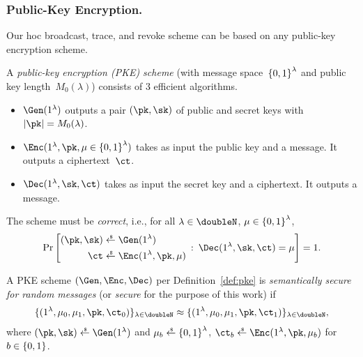 \subsubsection{Public-Key Encryption.}
Our \ad hoc broadcast, trace, and revoke scheme can be based on any public-key encryption scheme.

\begin{definition}[PKE]\label{def:pke}
A \emph{public-key encryption (PKE) scheme} (with message space~${\{0,1\}}^\lambda$ and public key length~$M_0(\lambda)$)
consists of 3 efficient algorithms.
\begin{itemize}
\item $\Gen(1^\lambda)$ outputs a pair $(\pk,\sk)$ of public and secret keys
with ${|\pk|=M_0(\lambda)}$.
\item ${\Enc(1^\lambda,\pk,\mu\in\bit^\lambda)}$ takes as input the public key and a message.
It outputs a ciphertext~$\ct$.
\item $\Dec(1^\lambda,\sk,\ct)$ takes as input the secret key and a ciphertext.
It outputs a message.
\end{itemize}
The scheme must be \emph{correct}, i.e., for all
${\lambda\in\doubleN}$,
${\mu\in{\{0,1\}}^\lambda}$,
\begin{align*}
\Pr\left[
\begin{aligned}
(\pk,\sk)&{}\draws\Gen(1^\lambda)\\
\ct&{}\draws\Enc(1^\lambda,\pk,\mu)
\end{aligned}
\::\:
\Dec(1^\lambda,\sk,\ct)=\mu
\right]=1.
\end{align*}
\end{definition}

\begin{definition}\label{def:pke-security}
A PKE scheme $(\Gen,\Enc,\Dec)$ per Definition~\ref{def:pke} is \emph{semantically secure for random messages} (or \emph{secure} for the purpose of this work) if
\begin{align*}
\{(1^\lambda,\mu_0,\mu_1,\pk,\ct_0)\}_{\lambda\in\doubleN}
\approx
\{(1^\lambda,\mu_0,\mu_1,\pk,\ct_1)\}_{\lambda\in\doubleN},
\end{align*}
where ${(\pk,\sk)\draws\Gen(1^\lambda)}$ and
${\mu_b\draws\bit^\lambda}$, ${\ct_b\draws\Enc(1^\lambda,\pk,\mu_b)}$ for~${b\in{\{0,1\}}}$.
\end{definition}
